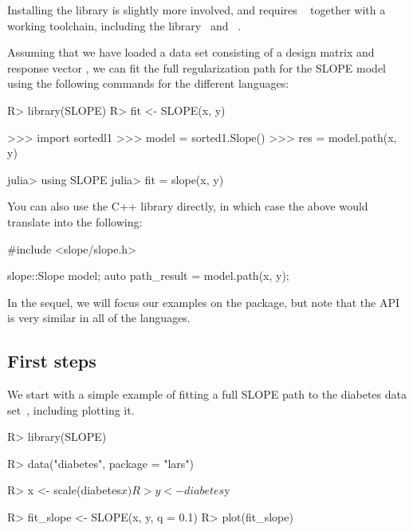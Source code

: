 \documentclass[article]{jss}
\begin{document}
Installing the  library is slightly more involved, and requires
~\citep{kitware2025} together with a working  toolchain, including
the  library~\citep{guennebaud2010a} and ~\citep{dagum1998}.

Assuming that we have loaded a data set consisting of a design
matrix  and response vector , we can fit the full regularization
path for the SLOPE model using the following commands for the different languages:

\begin{minipage}[t]{0.25\textwidth}%
  \begin{Code}
R> library(SLOPE)
R> fit <- SLOPE(x, y)
  \end{Code}
\end{minipage}
\hfill
\begin{minipage}[t]{0.32\textwidth}
  \begin{Code}
>>> import sortedl1
>>> model = sorted1.Slope()
>>> res = model.path(x, y)
  \end{Code}
\end{minipage}
\hfill
\begin{minipage}[t]{0.32\textwidth}
  \begin{Code}
julia> using SLOPE
julia> fit = slope(x, y)
  \end{Code}
\end{minipage}

\medskip

You can also use the C++ library directly, in
which case the above would translate into the
following:
\begin{Code}
#include <slope/slope.h>

slope::Slope model;
auto path_result = model.path(x, y);
\end{Code}

In the sequel, we will focus our examples on the  package, but
note that the API is very similar in all of the languages.

\subsection{First steps}

We start with a simple example of fitting a full SLOPE path to the diabetes
data set~\citep{efron2004}, including plotting it.

\begin{Code}
R> library(SLOPE)

R> data("diabetes", package = "lars")
 
R> x <- scale(diabetes$x)
R> y <- diabetes$y
 
R> fit_slope <- SLOPE(x, y, q = 0.1)
R> plot(fit_slope)
\end{Code}
\end{document}
